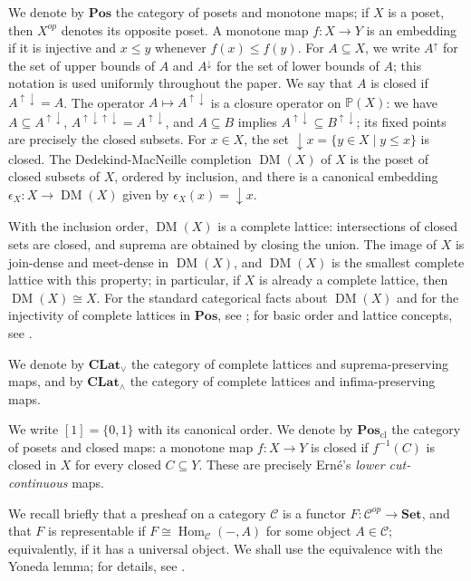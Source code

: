 \documentclass{amsart}
\theoremstyle{plain}
\theoremstyle{definition}
\theoremstyle{remark}
\DeclareMathOperator{\DM}{DM}
\DeclareMathOperator{\Hom}{Hom}
\begin{document}
We denote by $\mathbf{Pos}$ the category of posets and monotone maps; if $X$ is a poset, then $X^{op}$ denotes its opposite poset. A monotone map $f\colon X\longrightarrow Y$ is an embedding if it is injective and $x\leq y$ whenever $f(x)\leq f(y)$. For $A\subseteq X$, we write $A^{\uparrow}$ for the set of upper bounds of $A$ and $A^{\downarrow}$ for the set of lower bounds of $A$; this notation is used uniformly throughout the paper. We say that $A$ is closed if $A^{\uparrow\downarrow}=A$. The operator $A\mapsto A^{\uparrow\downarrow}$ is a closure operator on $\mathbb{P}(X)$: we have $A\subseteq A^{\uparrow\downarrow}$, $A^{\uparrow\downarrow\uparrow\downarrow}=A^{\uparrow\downarrow}$, and $A\subseteq B$ implies $A^{\uparrow\downarrow}\subseteq B^{\uparrow\downarrow}$; its fixed points are precisely the closed subsets. For $x\in X$, the set $\downarrow x=\{y\in X\mid y\leq x\}$ is closed. The Dedekind-MacNeille completion $\DM(X)$ of $X$ is the poset of closed subsets of $X$, ordered by inclusion, and there is a canonical embedding $\epsilon_X\colon X\longrightarrow\DM(X)$ given by $\epsilon_X(x)=\downarrow x$.

With the inclusion order, $\DM(X)$ is a complete lattice: intersections of closed sets are closed, and suprema are obtained by closing the union. The image of $X$ is join-dense and meet-dense in $\DM(X)$, and $\DM(X)$ is the smallest complete lattice with this property; in particular, if $X$ is already a complete lattice, then $\DM(X)\cong X$. For the standard categorical facts about $\DM(X)$ and for the injectivity of complete lattices in $\mathbf{Pos}$, see \cite{banaschewski1967categorical,adamek2004abstract}; for basic order and lattice concepts, see \cite{davey2002introduction}.

We denote by $\mathbf{CLat}_\vee$ the category of complete lattices and suprema-preserving maps, and by $\mathbf{CLat}_\wedge$ the category of complete lattices and infima-preserving maps.

We write $[1]=\{0,1\}$ with its canonical order. We denote by $\mathbf{Pos}_{\mathrm{cl}}$ the category of posets and closed maps: a monotone map $f\colon X\longrightarrow Y$ is closed if $f^{-1}(C)$ is closed in $X$ for every closed $C\subseteq Y$. These are precisely Ern\'e's \emph{lower cut-continuous} maps.

We recall briefly that a presheaf on a category $\mathcal{C}$ is a functor $F\colon\mathcal{C}^{op}\longrightarrow\mathbf{Set}$, and that $F$ is representable if $F\cong\Hom_{\mathcal{C}}(-,A)$ for some object $A\in\mathcal{C}$; equivalently, if it has a universal object. We shall use the equivalence with the Yoneda lemma; for details, see \cite{vistoli2005notes}.
\end{document}
